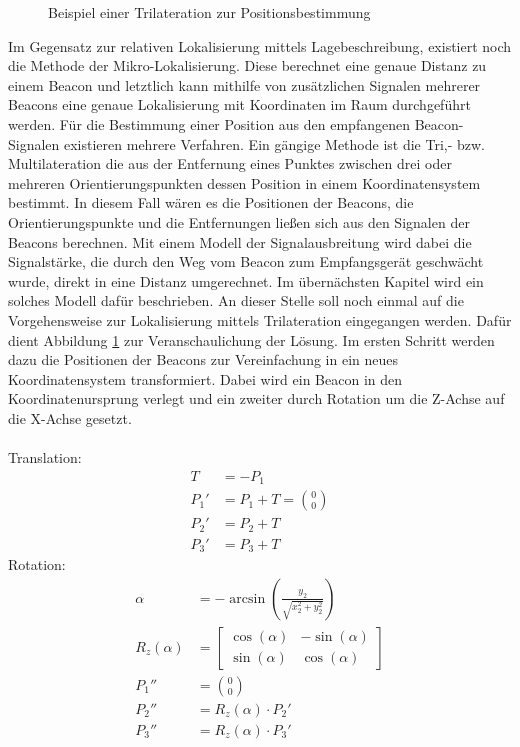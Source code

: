\begin{figure}
\caption{Beispiel einer Trilateration zur Positionsbestimmung}
\label{fig:Trilat}
\end{figure}
Im Gegensatz zur relativen Lokalisierung mittels Lagebeschreibung, existiert noch die Methode der Mikro-Lokalisierung. Diese berechnet eine genaue Distanz zu einem Beacon und letztlich kann mithilfe von zusätzlichen Signalen mehrerer Beacons eine genaue Lokalisierung mit Koordinaten im Raum  durchgeführt werden. Für die Bestimmung einer Position aus den empfangenen Beacon-Signalen existieren mehrere Verfahren. Ein gängige Methode ist die Tri,- bzw. Multilateration die aus der Entfernung eines Punktes zwischen drei oder mehreren Orientierungspunkten dessen Position in einem Koordinatensystem bestimmt. In diesem Fall wären es die Positionen der Beacons, die Orientierungspunkte und die Entfernungen ließen sich aus den Signalen der Beacons berechnen. Mit einem Modell der Signalausbreitung wird dabei die Signalstärke, die durch den Weg vom Beacon zum Empfangsgerät geschwächt wurde, direkt in eine Distanz umgerechnet. Im übernächsten Kapitel wird ein solches Modell dafür beschrieben. An dieser Stelle soll noch einmal auf die Vorgehensweise zur Lokalisierung mittels Trilateration eingegangen werden. Dafür dient Abbildung \ref{fig:Trilat} zur Veranschaulichung der Lösung. Im ersten Schritt werden dazu die Positionen der Beacons zur Vereinfachung in ein neues Koordinatensystem transformiert. Dabei wird ein Beacon in den Koordinatenursprung verlegt und ein zweiter durch Rotation um die Z-Achse auf die X-Achse gesetzt.\\ \\
Translation:
\begin{align*}
T &= -P_1\\
P_1' &= P_1 + T = \binom{0}{0}\\
P_2' &= P_2 + T\\
P_3' &= P_3 + T
\end{align*} 
Rotation:
\begin{align*}
\alpha &= -\arcsin \left ( \frac{y_2}{\sqrt{x_2^2+y_2^2}} \right )\\
R_z\left ( \alpha \right ) &= \begin{bmatrix}
\cos\left ( \alpha \right ) & -\sin\left ( \alpha \right )\\ 
\sin\left ( \alpha \right ) & \cos\left ( \alpha \right )
\end{bmatrix}\\
P_1'' &= \binom{0}{0}\\
P_2'' &= R_z\left ( \alpha \right ) \cdot P_2'\\
P_3'' &= R_z\left ( \alpha \right ) \cdot P_3'
\end{align*}

